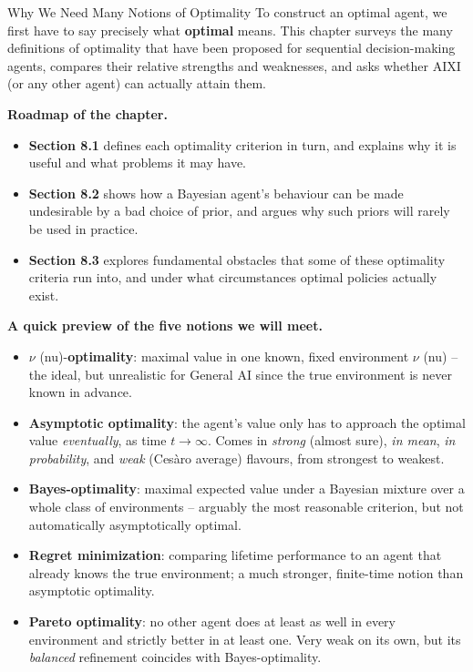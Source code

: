 \documentclass[aspectratio=169,10pt]{beamer}
\begin{document}
\begin{frame}[allowframebreaks]{Why We Need Many Notions of Optimality}
  To construct an optimal agent, we first have to say precisely what
  \textbf{optimal} means. This chapter surveys the many definitions of
  optimality that have been proposed for sequential decision-making agents,
  compares their relative strengths and weaknesses, and asks whether AIXI (or
  any other agent) can actually attain them.

  \bigskip
  \textbf{Roadmap of the chapter.}
  \begin{itemize}
    \item \textbf{Section 8.1} defines each optimality criterion in turn, and
      explains why it is useful and what problems it may have.
    \item \textbf{Section 8.2} shows how a Bayesian agent's behaviour can be
      made undesirable by a bad choice of prior, and argues why such priors
      will rarely be used in practice.
    \item \textbf{Section 8.3} explores fundamental obstacles that some of
      these optimality criteria run into, and under what circumstances
      optimal policies actually exist.
  \end{itemize}

  \bigskip
  \textbf{A quick preview of the five notions we will meet.}
  \begin{itemize}
    \item $\nu$ (nu)-\textbf{optimality}: maximal value in one known,
      fixed environment $\nu$ (nu) -- the ideal, but unrealistic for General
      AI since the true environment is never known in advance.
    \item \textbf{Asymptotic optimality}: the agent's value only has to
      approach the optimal value \emph{eventually}, as time $t\to\infty$.
      Comes in \emph{strong} (almost sure), \emph{in mean}, \emph{in
      probability}, and \emph{weak} (Ces\`aro average) flavours, from
      strongest to weakest.
    \item \textbf{Bayes-optimality}: maximal expected value under a
      Bayesian mixture over a whole class of environments -- arguably the
      most reasonable criterion, but not automatically asymptotically
      optimal.
    \item \textbf{Regret minimization}: comparing lifetime performance to an
      agent that already knows the true environment; a much stronger,
      finite-time notion than asymptotic optimality.
    \item \textbf{Pareto optimality}: no other agent does at least as well in
      every environment and strictly better in at least one. Very weak on
      its own, but its \emph{balanced} refinement coincides with
      Bayes-optimality.
  \end{itemize}
\end{frame}
\end{document}
